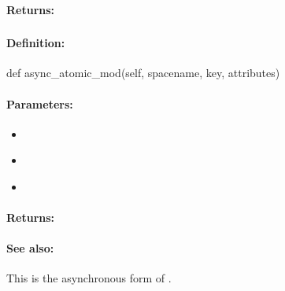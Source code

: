\paragraph{Returns:}


\pagebreak
\subsubsection{}
\label{api:python:async_atomic_mod}


\paragraph{Definition:}
\begin{pythoncode}
def async_atomic_mod(self, spacename, key, attributes)
\end{pythoncode}

\paragraph{Parameters:}
\begin{itemize}[noitemsep]
\item {}\\

\item {}\\

\item {}\\

\end{itemize}

\paragraph{Returns:}


\paragraph{See also:}  This is the asynchronous form of .

\pagebreak
\subsubsection{}
\label{api:python:cond_atomic_mod}


